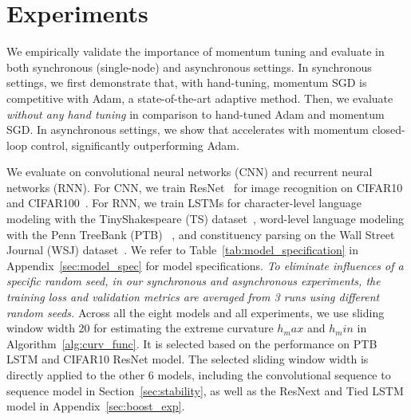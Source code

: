 \vspace{-0.25em}
\section{Experiments}
\label{sec:experiments}
\vspace{-0.25em}
We empirically validate the importance of momentum tuning and evaluate \tuner in both synchronous (single-node) and asynchronous settings.
In synchronous settings, we first demonstrate that, with hand-tuning, momentum SGD is competitive with Adam, a state-of-the-art adaptive method.
Then, we evaluate \tuner \emph{without any hand tuning} in comparison to hand-tuned Adam and momentum SGD.
In asynchronous settings, we show that \asynctuner accelerates with momentum closed-loop control, significantly outperforming Adam.

We evaluate on convolutional neural networks (CNN) and recurrent neural networks (RNN). For CNN, we train ResNet~\citep{he2016deep} for image recognition on CIFAR10 and CIFAR100~\citep{krizhevsky2014cifar}.
For RNN, we train LSTMs for character-level language modeling with 
the TinyShakespeare (TS) dataset~\citep{karpathy2015visualizing}, word-level language modeling with the Penn TreeBank (PTB) ~\citep{marcus1993building}, and constituency parsing on the Wall Street Journal (WSJ) dataset~\citep{charniakparsing}.
We refer to Table~\ref{tab:model_specification} in Appendix~\ref{sec:model_spec} for model specifications. 
\emph{To eliminate influences of a specific random seed, in our synchronous and asynchronous experiments, the training loss and validation metrics are averaged from 3 runs using different random seeds.}
Across all the eight models and all experiments, we use sliding window width 20 for estimating the extreme curvature $h_max$ and $h_min$ in Algorithm~\ref{alg:curv_func}. It is selected based on the performance on PTB LSTM and CIFAR10 ResNet model. The selected sliding window width is directly applied to the other 6 models, including the convolutional sequence to sequence model in Section~\ref{sec:stability}, as well as the ResNext and Tied LSTM model in Appendix~\ref{sec:boost_exp}.


